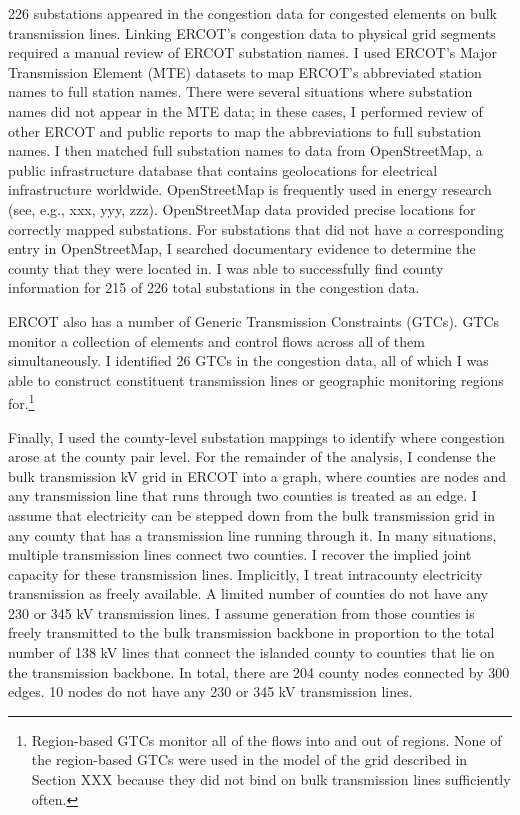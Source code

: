 \documentclass[12pt]{article}
\begin{document}
226 substations appeared in the congestion data for congested elements on bulk transmission lines. Linking ERCOT's congestion data to physical grid segments required a manual review of ERCOT substation names. I used ERCOT's Major Transmission Element (MTE) datasets to map ERCOT's abbreviated station names to full station names. There were several situations where substation names did not appear in the MTE data; in these cases, I performed review of other ERCOT and public reports to map the abbreviations to full substation names. I then matched full substation names to data from OpenStreetMap, a public infrastructure database that contains geolocations for electrical infrastructure worldwide. OpenStreetMap is frequently used in energy research (see, e.g., xxx, yyy, zzz). OpenStreetMap data provided precise locations for correctly mapped substations. For substations that did not have a corresponding entry in OpenStreetMap, I searched documentary evidence to determine the county that they were located in. I was able to successfully find county information for 215 of 226 total substations in the congestion data. 

ERCOT also has a number of Generic Transmission Constraints (GTCs). GTCs monitor a collection of elements and control flows across all of them simultaneously. I identified 26 GTCs in the congestion data, all of which I was able to construct constituent transmission lines or geographic monitoring regions for.\footnote{Region-based GTCs monitor all of the flows into and out of regions. None of the region-based GTCs were used in the model of the grid described in Section XXX because they did not bind on bulk transmission lines sufficiently often.} 

Finally, I used the county-level substation mappings to identify where congestion arose at the county pair level. For the remainder of the analysis, I condense the bulk transmission kV grid in ERCOT into a graph, where counties are nodes and any transmission line that runs through two counties is treated as an edge. I assume that electricity can be stepped down from the bulk transmission grid in any county that has a transmission line running through it. In many situations, multiple transmission lines connect two counties. I recover the implied joint capacity for these transmission lines. Implicitly, I treat intracounty electricity transmission as freely available. A limited number of counties do not have any 230 or 345 kV transmission lines. I assume generation from those counties is freely transmitted to the bulk transmission backbone in proportion to the total number of 138 kV lines that connect the islanded county to counties that lie on the transmission backbone. In total, there are 204 county nodes connected by 300 edges. 10 nodes do not have any 230 or 345 kV transmission lines. 
\end{document}
